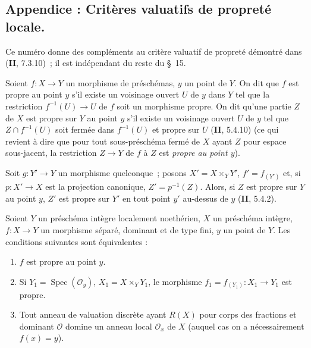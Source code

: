 
\subsection{Appendice : Critères valuatifs de propreté locale.}
\label{subsection:IV.15.7-fr}

Ce numéro donne des compléments au critère valuatif de propreté démontré dans (\textbf{II}, 7.3.10)~; il est indépendant du reste du \S~15.

\begin{definition}[15.7.1]
\label{IV.15.7.1-fr}
Soient $f:X\to Y$ un morphisme de préschémas, $y$ un point de $Y$. On dit que $f$ est \textup{propre au point} $y$ s'il existe un voisinage ouvert $U$ de $y$ dans $Y$ tel que la restriction $f^{-1}(U)\to U$ de $f$ soit un morphisme propre. On dit qu'une partie $Z$ de $X$ est propre sur $Y$ au point $y$ s'il existe un voisinage ouvert $U$ de $y$ tel que $Z\cap f^{-1}(U)$ soit fermée dans $f^{-1}(U)$ et propre sur $U$ \textup{(\textbf{II}, 5.4.10)} \textup{(ce qui revient à dire que pour tout sous-préschéma fermé de $X$ ayant $Z$ pour espace sous-jacent, la restriction $Z\to Y$ de $f$ à $Z$ est \emph{propre au point $y$})}.
\end{definition}

Soit $g:Y'\to Y$ un morphisme quelconque~; posons $X'=X\times_Y Y'$, $f'=f_{(Y')}$ et, si $p:X'\to X$ est la projection canonique, $Z'=p^{-1}(Z)$. Alors, si $Z$ est propre sur $Y$ au point $y$, $Z'$ est propre sur $Y'$ en tout point $y'$ au-dessus de $y$ (\textbf{II}, 5.4.2).

\begin{proposition}[15.7.2]
\label{IV.15.7.2-fr}
Soient $Y$ un préschéma intègre localement noethérien, $X$ un préschéma intègre, $f:X\to Y$ un morphisme séparé, dominant et de type fini, $y$ un point de $Y$. Les conditions suivantes sont équivalentes :
\begin{enumerate}[label=\emph{\alph*)}]
  \item $f$ est propre au point $y$.
  \item Si $Y_1=\operatorname{Spec}(\mathcal O_y)$, $X_1=X\times_Y Y_1$, le morphisme $f_1=f_{(Y_1)}:X_1\to Y_1$ est propre.
  \item Tout anneau de valuation discrète ayant $R(X)$ pour corps des fractions et dominant $\mathcal O$ domine un anneau local $\mathcal O_x$ de $X$ \textup{(auquel cas on a nécessairement $f(x)=y$)}.
\end{enumerate}
\end{proposition}

